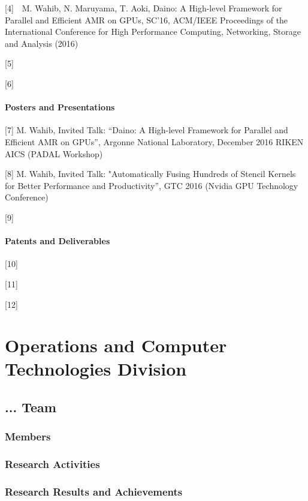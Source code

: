 \documentclass{book}
\begin{document}
[4]~~M. Wahib, N. Maruyama, T. Aoki, Daino: A High-level Framework for Parallel and Efficient AMR on GPUs, SC'16, ACM/IEEE Proceedings of the International Conference for High Performance Computing, Networking, Storage and Analysis (2016) \newline

[5]

[6]

\subsection{Posters and Presentations}
[7] M. Wahib, Invited Talk: “Daino: A High-level Framework for Parallel and Efficient AMR on GPUs”, Argonne National Laboratory, December 2016
RIKEN AICS (PADAL Workshop) \newline

[8] M. Wahib, Invited Talk: "Automatically Fusing Hundreds of Stencil Kernels for Better Performance and Productivity”, GTC 2016 (Nvidia GPU Technology Conference) \newline

[9]

\subsection{Patents and Deliverables}

[10]

[11]

[12]

\part{Operations and Computer Technologies Division}

\chapter{... Team}

\section{Members}

\section{Research Activities}

\section{Research Results and Achievements}
\end{document}

